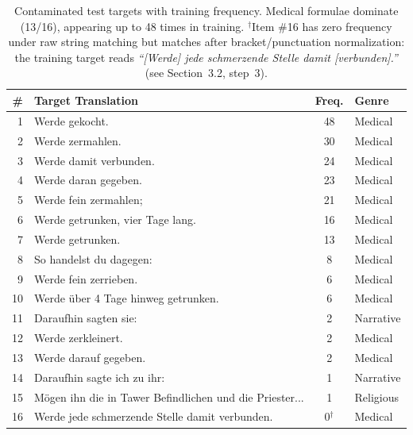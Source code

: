 \begin{table}[t]
\centering
\small
\begin{tabular}{rlcl}
\toprule
\textbf{\#} & \textbf{Target Translation} & \textbf{Freq.} & \textbf{Genre} \\
\midrule
1 & Werde gekocht. & 48 & Medical \\
2 & Werde zermahlen. & 30 & Medical \\
3 & Werde damit verbunden. & 24 & Medical \\
4 & Werde daran gegeben. & 23 & Medical \\
5 & Werde fein zermahlen; & 21 & Medical \\
6 & Werde getrunken, vier Tage lang. & 16 & Medical \\
7 & Werde getrunken. & 13 & Medical \\
8 & So handelst du dagegen: & 8 & Medical \\
9 & Werde fein zerrieben. & 6 & Medical \\
10 & Werde über 4 Tage hinweg getrunken. & 6 & Medical \\
11 & Daraufhin sagten sie: & 2 & Narrative \\
12 & Werde zerkleinert. & 2 & Medical \\
13 & Werde darauf gegeben. & 2 & Medical \\
14 & Daraufhin sagte ich zu ihr: & 1 & Narrative \\
15 & Mögen ihn die in Tawer Befindlichen und die Priester... & 1 & Religious \\
16 & Werde jede schmerzende Stelle damit verbunden. & 0$^{\dagger}$ & Medical \\
\bottomrule
\end{tabular}
\caption{Contaminated test targets with training frequency. Medical formulae dominate (13/16), appearing up to 48 times in training. $^{\dagger}$Item \#16 has zero frequency under raw string matching but matches after bracket/punctuation normalization: the training target reads \textit{``[Werde] jede schmerzende Stelle damit [verbunden].''} (see Section~3.2, step~3).}
\label{tab:contamination-catalog}
\end{table}